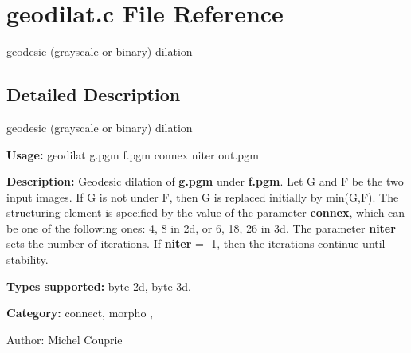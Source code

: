 \section{geodilat.c File Reference}
\label{geodilat_8c}
geodesic (grayscale or binary) dilation 



\subsection{Detailed Description}
geodesic (grayscale or binary) dilation 

{\bf Usage:} geodilat g.pgm f.pgm connex niter out.pgm

{\bf Description:} Geodesic dilation of {\bf g.pgm} under {\bf f.pgm}. Let G and F be the two input images. If G is not under F, then G is replaced initially by min(G,F). The structuring element is specified by the value of the parameter {\bf connex}, which can be one of the following ones: 4, 8 in 2d, or 6, 18, 26 in 3d. The parameter {\bf niter} sets the number of iterations. If {\bf niter} = -1, then the iterations continue until stability.

{\bf Types supported:} byte 2d, byte 3d.

{\bf Category:} connect, morpho ,

\begin{Desc}
\item[Author:]Michel Couprie \end{Desc}
